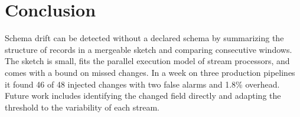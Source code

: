 \section{Conclusion}\label{sec:conclusion}
Schema drift can be detected without a declared schema by summarizing the structure of records in a mergeable sketch and comparing consecutive windows. The sketch is small, fits the parallel execution model of stream processors, and comes with a bound on missed changes. In a week on three production pipelines it found 46 of 48 injected changes with two false alarms and 1.8\% overhead. Future work includes identifying the changed field directly and adapting the threshold to the variability of each stream.
